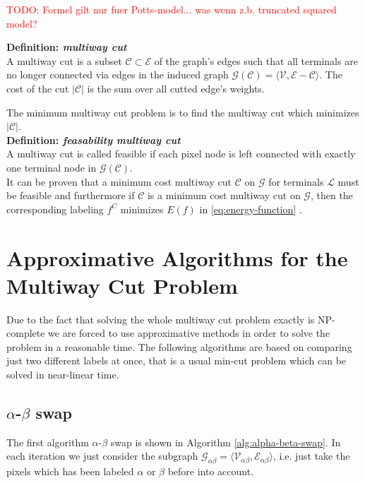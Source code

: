 \documentclass{scrartcl}[12pt, halfparskip]
\newcommand{\todo}[1]{\textcolor{red}{TODO: #1}}
\begin{document}
\todo{Formel gilt nur fuer Potts-model... was wenn z.b. truncated squared model?}

\textbf{Definition: \textit{multiway cut}}\\
A multiway cut is a subset $\mathcal{C} \subset \mathcal{E}$ of the graph's edges such that all terminals are no longer connected via edges in the induced graph $\mathcal{G}(\mathcal{C}) = \langle \mathcal{V}, \mathcal{E} - \mathcal{C}\rangle$. The cost of the cut $|\mathcal{C}|$ is the sum over all cutted edge's weights. 

The minimum multiway cut problem is to find the multiway cut which minimizes $|\mathcal{C}|$. \\

\textbf{Definition: \textit{feasability multiway cut}}\\
A multiway cut is called feasible if each pixel node is left connected with exactly one terminal node in $\mathcal{G}(\mathcal{C})$. \\


It can be proven that a minimum cost multiway cut $\mathcal{C}$ on $\mathcal{G}$ for terminals $\mathcal{L}$ must be feasible \cite{boykov98} and furthermore if $\mathcal{C}$ is a minimum cost multiway cut on $\mathcal{G}$, then the corresponding labeling $f^C$ minimizes $E(f)$ in \eqref{eq:energy-function} \cite{boykov98}.





\section{Approximative Algorithms for the Multiway Cut Problem}
Due to the fact that solving the whole multiway cut problem exactly is NP-complete we are forced to use approximative methods in order to solve the problem in a reasonable time.
The following algorithms are based on comparing just two different labels at once, that is a usual min-cut problem which can be solved in near-linear time.


\subsection{$\alpha$-$\beta$ swap}

The first algorithm $\alpha$-$\beta$ swap is shown in Algorithm \ref{alg:alpha-beta-swap}. In each iteration we just consider the subgraph $\mathcal{G}_{\alpha \beta} = \langle \mathcal{V}_{\alpha \beta}, \mathcal{E}_{\alpha \beta} \rangle$, i.e. just take the pixels which has been labeled $\alpha$ or $\beta$ before into account. 
\end{document}
